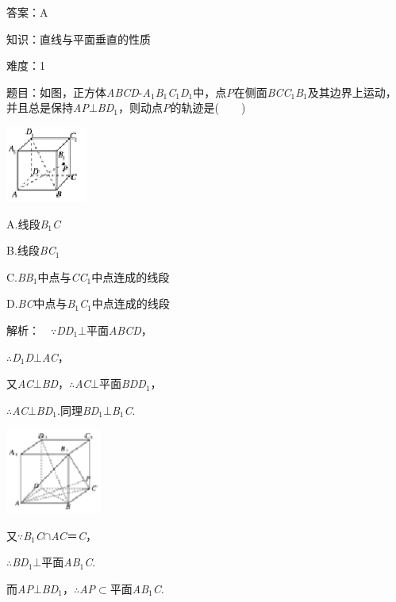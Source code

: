 \documentclass{article} %
\begin{document}
答案：A

知识：直线与平面垂直的性质

难度：1

题目：如图，正方体\textit{ABCD}-\textit{A}${}_{1}$\textit{B}${}_{1}$\textit{C}${}_{1}$\textit{D}${}_{1}$中，点\textit{P}在侧面\textit{BCC}${}_{1}$\textit{B}${}_{1}$及其边界上运动，并且总是保持\textit{AP}$\mathrm{\bot}$\textit{BD}${}_{1}$，则动点\textit{P}的轨迹是(　　)

\includegraphics*[width=1.05in, height=0.98in, keepaspectratio=false]{image233}

A.线段\textit{B}${}_{1}$\textit{C}

B.线段\textit{BC}${}_{1}$

C.\textit{BB}${}_{1}$中点与\textit{CC}${}_{1}$中点连成的线段

D.\textit{BC}中点与\textit{B}${}_{1}$\textit{C}${}_{1}$中点连成的线段

解析：　$\mathrm{\because}$\textit{DD}${}_{1}$$\mathrm{\bot}$平面\textit{ABCD}，

$\mathrm{\therefore}$\textit{D}${}_{1}$\textit{D}$\mathrm{\bot}$\textit{AC}，

又\textit{AC}$\mathrm{\bot}$\textit{BD}，$\mathrm{\therefore}$\textit{AC}$\mathrm{\bot}$平面\textit{BDD}${}_{1}$，

$\mathrm{\therefore}$\textit{AC}$\mathrm{\bot}$\textit{BD}${}_{1}$.同理\textit{BD}${}_{1}$$\mathrm{\bot}$\textit{B}${}_{1}$\textit{C}.

\includegraphics*[width=1.25in, height=1.10in, keepaspectratio=false]{image234}

又$\mathrm{\because}$\textit{B}${}_{1}$\textit{C}$\mathrm{\cap}$\textit{AC}＝\textit{C}，

$\mathrm{\therefore}$\textit{BD}${}_{1}$$\mathrm{\bot}$平面\textit{AB}${}_{1}$\textit{C}.

而\textit{AP}$\mathrm{\bot}$\textit{BD}${}_{1}$，$\mathrm{\therefore}$\textit{AP}$\mathrm{\subset }$平面\textit{AB}${}_{1}$\textit{C}.
\end{document}
